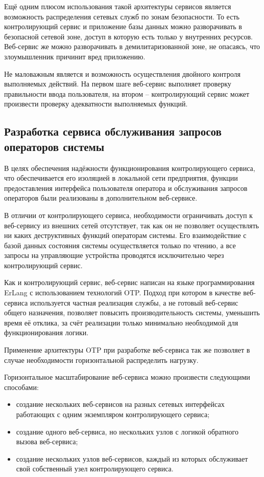 Ещё одним плюсом использования такой архитектуры сервисов является возможность распределения
сетевых служб по зонам безопасности. То есть контролирующий сервис и приложение базы данных можно разворачивать
в безопасной сетевой зоне, доступ в которую есть только у внутренних ресурсов. Веб-сервис же можно разворачивать
в демилитаризованной зоне, не опасаясь, что злоумышленник причинит вред приложению.

Не маловажным является и возможность осуществления двойного контроля выполняемых действий. На первом шаге
веб-сервис выполняет проверку правильности ввода пользователя, на втором -- контролирующий сервис
может произвести проверку адекватности выполняемых функций.


\subsection{Разработка сервиса обслуживания запросов операторов системы}
В целях обеспечения надёжности функционирования контролирующего сервиса, что обеспечивается его
 изоляцией в локальной сети предприятия, функции предоставления интерфейса пользователя оператора
и обслуживания запросов операторов были реализованы в дополнительном веб-сервисе.

В отличии от контролирующего сервиса, необходимости ограничивать доступ к веб-сервису из внешних
сетей отсутствует, так как он не позволяет осуществлять ни каких деструктивных функций
операторам системы. Его взаимодействие с базой данных состояния системы осуществляется только по чтению,
а все запросы на управляющие устройства проводятся исключительно через контролирующий сервис.

Как и контролирующий сервис, веб-сервис написан на языке программирования ErLang с использованием технологий
OTP. Подход при котором в качестве веб-сервиса используется частная реализация службы, а не готовый веб-сервис
общего назначения, позволяет повысить производительность системы, уменьшить время её отклика, за счёт реализации
только минимально необходимой для функционирования логики.

Применение архитектуры OTP при разработке веб-сервиса так же позволяет в случае необходимости горизонтальной
распределить нагрузку.

Горизонтальное масштабирование веб-сервиса можно произвести следующими способами:
\begin{itemize}
	\item создание нескольких веб-сервисов на разных сетевых интерфейсах работающих с одним экземпляром
		контролирующего сервиса;
	\item создание одного веб-сервиса, но нескольких узлов с логикой обратного вызова веб-сервиса;
	\item создание нескольких узлов веб-сервисов, каждый из которых обслуживает свой собственный узел
		контролирующего сервиса.
\end{itemize}


